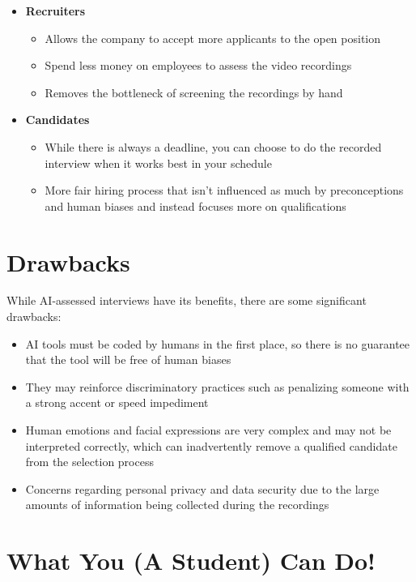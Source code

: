 \documentclass[
]{book}
\begin{document}
\begin{itemize}
\item
  \textbf{Recruiters}

  \begin{itemize}
  \item
    Allows the company to accept more applicants to the open position~
  \item
    Spend less money on employees to assess the video recordings
  \item
    Removes the bottleneck of screening the recordings by hand
  \end{itemize}
\item
  \textbf{Candidates}

  \begin{itemize}
  \item
    While there is always a deadline, you can choose to do the recorded interview when it works best in your schedule
  \item
    More fair hiring process that isn't influenced as much by preconceptions and human biases and instead focuses more on qualifications
  \end{itemize}
\end{itemize}

\hypertarget{drawbacks}{%
\section{Drawbacks}\label{drawbacks}}

While AI-assessed interviews have its benefits, there are some significant drawbacks:

\begin{itemize}
\item
  AI tools must be coded by humans in the first place, so there is no guarantee that the tool will be free of human biases
\item
  They may reinforce discriminatory practices such as penalizing someone with a strong accent or speed impediment
\item
  Human emotions and facial expressions are very complex and may not be interpreted correctly, which can inadvertently remove a qualified candidate from the selection process
\item
  Concerns regarding personal privacy and data security due to the large amounts of information being collected during the recordings
\end{itemize}

\hypertarget{what-you-a-student-can-do-2}{%
\section{What You (A Student) Can Do!}\label{what-you-a-student-can-do-2}}
\end{document}
